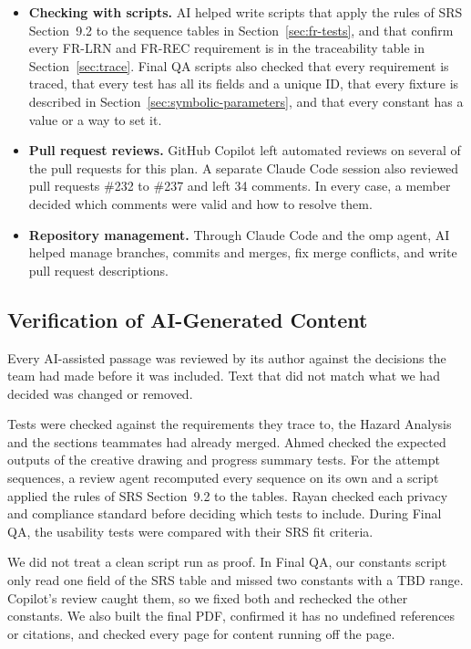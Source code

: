 \documentclass[12pt, titlepage]{article}
\begin{document}
\begin{itemize}
  \item \textbf{Checking with scripts.} AI helped write scripts that apply the
  rules of SRS Section~9.2 to the sequence tables in Section~\ref{sec:fr-tests}, and that
  confirm every FR-LRN and FR-REC requirement is in the traceability table in
  Section~\ref{sec:trace}. Final QA scripts also checked that every requirement is traced,
  that every test has all its fields and a unique ID, that every fixture is
  described in Section~\ref{sec:symbolic-parameters}, and that every constant has a value or a way to set
  it.

  \item \textbf{Pull request reviews.} GitHub Copilot left automated reviews on
  several of the pull requests for this plan. A separate Claude Code session
  also reviewed pull requests \#232 to \#237 and left 34 comments. In every
  case, a member decided which comments were valid and how to resolve them.

  \item \textbf{Repository management.} Through Claude Code and the omp agent,
  AI helped manage branches, commits and merges, fix merge conflicts, and write
  pull request descriptions.
\end{itemize}

\subsection{Verification of AI-Generated Content}

Every AI-assisted passage was reviewed by its author against the decisions the
team had made before it was included. Text that did not match what we had
decided was changed or removed.

Tests were checked against the requirements they trace to, the Hazard Analysis
and the sections teammates had already merged. Ahmed checked the expected
outputs of the creative drawing and progress summary tests. For the
attempt sequences, a review agent recomputed every sequence on its own and a
script applied the rules of SRS Section~9.2 to the tables. Rayan checked each
privacy and compliance standard before deciding which tests to include. During
Final QA, the usability tests were compared with their SRS fit criteria.

We did not treat a clean script run as proof. In Final QA, our constants script
only read one field of the SRS table and missed two constants with a TBD range.
Copilot's review caught them, so we fixed both and rechecked the other
constants. We also built the final PDF, confirmed it has no undefined
references or citations, and checked every page for content running off the
page.
\end{document}

